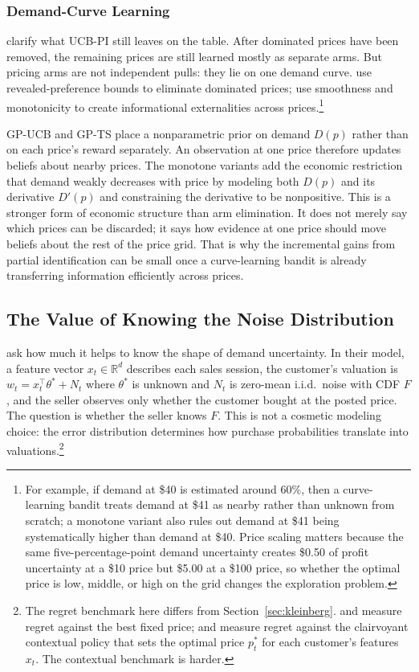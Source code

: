 \subsubsection{Demand-Curve Learning}

\citet{Weaver2025} clarify what UCB-PI still leaves on the table. After dominated prices have been removed, the remaining prices are still learned mostly as separate arms. But pricing arms are not independent pulls: they lie on one demand curve. \citet{Misra2019} use revealed-preference bounds to eliminate dominated prices; \citet{Weaver2025} use smoothness and monotonicity to create informational externalities across prices.\footnote{For example, if demand at \$40 is estimated around 60\%, then a curve-learning bandit treats demand at \$41 as nearby rather than unknown from scratch; a monotone variant also rules out demand at \$41 being systematically higher than demand at \$40. Price scaling matters because the same five-percentage-point demand uncertainty creates \$0.50 of profit uncertainty at a \$10 price but \$5.00 at a \$100 price, so whether the optimal price is low, middle, or high on the grid changes the exploration problem.}

GP-UCB and GP-TS place a nonparametric prior on demand $D(p)$ rather than on each price's reward separately. An observation at one price therefore updates beliefs about nearby prices. The monotone variants add the economic restriction that demand weakly decreases with price by modeling both $D(p)$ and its derivative $D'(p)$ and constraining the derivative to be nonpositive. This is a stronger form of economic structure than arm elimination. It does not merely say which prices can be discarded; it says how evidence at one price should move beliefs about the rest of the price grid. That is why the incremental gains from partial identification can be small once a curve-learning bandit is already transferring information efficiently across prices.

\subsection{The Value of Knowing the Noise Distribution}
\label{sec:xu}

\citet{Xu2021} ask how much it helps to know the shape of demand uncertainty. In their model, a feature vector $x_t \in \mathbb{R}^d$ describes each sales session, the customer's valuation is $w_t = x_t^\top \theta^* + N_t$ where $\theta^*$ is unknown and $N_t$ is zero-mean i.i.d.\ noise with CDF $F$, and the seller observes only whether the customer bought at the posted price. The question is whether the seller knows $F$. This is not a cosmetic modeling choice: the error distribution determines how purchase probabilities translate into valuations.\footnote{The regret benchmark here differs from Section~\ref{sec:kleinberg}. \citet{Kleinberg2003} and \citet{Broder2012} measure regret against the best fixed price; \citet{Xu2021} and \citet{Liu2024strategic} measure regret against the clairvoyant contextual policy that sets the optimal price $p_t^*$ for each customer's features $x_t$. The contextual benchmark is harder.}

